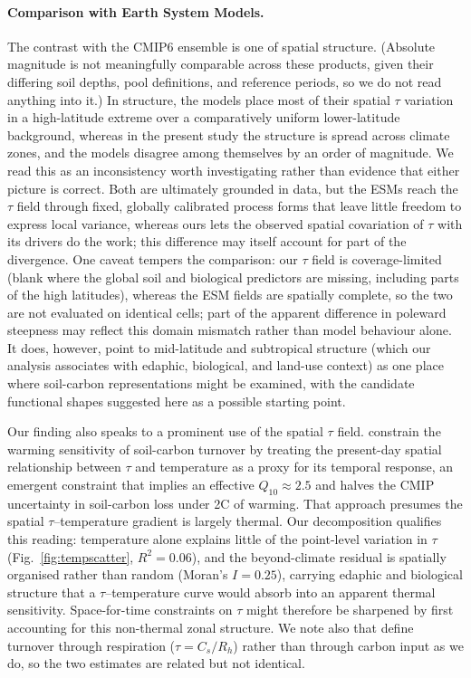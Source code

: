\documentclass[12pt, a4paper]{article}
\begin{document}
\paragraph{Comparison with Earth System Models.}
The contrast with the CMIP6 ensemble is one of spatial structure. (Absolute
magnitude is not meaningfully comparable across these products, given their
differing soil depths, pool definitions, and reference periods, so we do not read
anything into it.) In structure, the models place most of their spatial $\tau$
variation in a high-latitude extreme over a comparatively uniform lower-latitude
background, whereas in the present study the structure is spread across climate
zones, and the models disagree among themselves by an order of magnitude. We read
this as an inconsistency worth investigating rather than evidence that either
picture is correct. Both are ultimately grounded in data, but the ESMs reach the
$\tau$ field through fixed, globally calibrated process forms that leave little
freedom to express local variance, whereas ours lets the observed spatial
covariation of $\tau$ with its drivers do the work; this difference may itself
account for part of the divergence. One caveat tempers the comparison: our $\tau$
field is coverage-limited (blank where the global soil and biological predictors are
missing, including parts of the high latitudes), whereas the ESM fields are spatially
complete, so the two are not evaluated on identical cells; part of the apparent
difference in poleward steepness may reflect this domain mismatch rather than model
behaviour alone. It does, however, point to mid-latitude and subtropical
structure (which our analysis associates with edaphic, biological, and land-use
context) as one place where soil-carbon representations might be examined, with the
candidate functional shapes suggested here as a possible starting point.

Our finding also speaks to a prominent use of the spatial $\tau$ field.
\citet{Varney2020} constrain the warming sensitivity of soil-carbon turnover by
treating the present-day spatial relationship between $\tau$ and temperature as a
proxy for its temporal response, an emergent constraint that implies an effective
$Q_{10}\approx2.5$ and halves the CMIP uncertainty in soil-carbon loss under
2\textdegree{}C of warming. That approach presumes the spatial $\tau$--temperature
gradient is largely thermal. Our decomposition qualifies this reading: temperature
alone explains little of the point-level variation in $\tau$
(Fig.~\ref{fig:tempscatter}, $R^2=0.06$), and the beyond-climate residual is
spatially organised rather than random (Moran's $I=0.25$), carrying edaphic and
biological structure that a $\tau$--temperature curve would absorb into an apparent
thermal sensitivity. Space-for-time constraints on $\tau$ might therefore be
sharpened by first accounting for this non-thermal zonal structure. We note also
that \citeauthor{Varney2020} define turnover through respiration
($\tau=C_s/R_h$) rather than through carbon input as we do, so the two estimates are
related but not identical.
\end{document}
